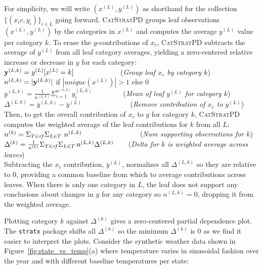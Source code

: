 \documentclass[12pt]{article}
\newcommand{\figref}[1]{Figure~\ref{#1}}
\newcommand{\cspd}{\fontfamily{cmr}\textsc{\small CatStratPD}}
\newcommand{\xnc}{$x_{\overline{c}}$}
\begin{document}
{\begin{appendices}
For simplicity, we will write $(x^{(L)}, y^{(L)})$ as shorthand for the collection $\{(x_ic, y_i)\}_{i \in L}$ going forward. \cspd{} groups leaf observations $(x^{(L)}, y^{(L)})$ by the categories in $x^{(L)}$ and computes the average $y^{(L)}$ value per category $k$. To erase the $y$-contributions of \xnc{}, \cspd{} subtracts the average of $y^{(L)}$ from all leaf category averages, yielding a zero-centered relative increase or decrease in $y$ for each category:\\

\noindent ${\bf y}^{(L,k)} = y^{(L)}[x^{(L)}=k]$~~~~~~~~~~~~~({\it Group leaf $x_c$ by category $k$})\\
$n^{(L,k)} = |{\bf y}^{(L,k)}|$ if $|unique(x^{(L)})| > 1$ else 0\\
$\overline{y}^{(L,k)} = \frac{1}{n^{(L,k)}} \Sigma_{i=1}^{n^{(L,k)}} y_i^{(L,k)}$ ~~~~~~~~({\it Mean of leaf $y^{(L)}$ for category $k$})\\
$\Delta^{(L,k)} = \overline{y}^{(L,k)} - \overline{y}^{(L)}$ ~~~~~~~~~~~~~({\it Remove contribution of $x_{\overline{c}}$ to $y^{(L)}$})\\

\noindent Then, to get the overall contribution of $x_c$ to $y$ for category $k$, \cspd{} computes the weighted average of the leaf contributions for $k$ from all $L$:\\

\noindent $n^{(k)} = \Sigma_{T \in {\it rf}} \Sigma_{L \in T} ~n^{(L,k)}$~\,~~~~~~~~~~~~~~~({\it Num supporting observations for $k$})\\
$\Delta^{(k)} = \frac{1}{n^{(k)}} \Sigma_{T \in {\it rf}} \Sigma_{L \in T} \,n^{(L,k)}\Delta^{(L,k)}$~~~~({\it Delta for $k$ is weighted average across leaves})\\

\noindent Subtracting the \xnc{} contribution, $\overline{y}^{(L)}$, normalizes all $\Delta^{(L,k)}$ so they are relative to 0, providing a common baseline from which to average contributions across leaves. When there is only one category in $L$, the leaf does not support any conclusions about changes in $y$ for any category so $n^{(L,k)}=0$, dropping it from the weighted average. 

Plotting category $k$ against $\Delta^{(k)}$ gives a zero-centered partial dependence plot. The {\tt stratx} package shifts all $\Delta^{(k)}$ so the minimum $\Delta^{(k)}$ is 0 as we find it easier to interpret the plots. Consider the synthetic weather data shown in \figref{fig:state_vs_temp}(a) where temperature varies in sinusoidal fashion over the year and with different baseline temperatures per state:


\end{appendices}}
\end{document}
